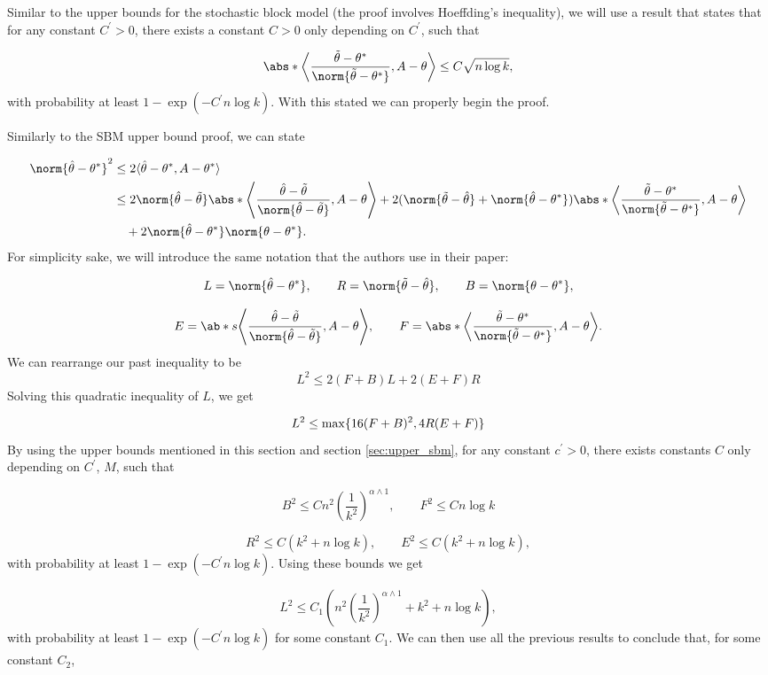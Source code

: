 \documentclass[11pt]{article}
\begin{document}
Similar to the upper bounds for the stochastic block model (the proof involves Hoeffding's inequality), we will use a result that states that for any constant $C^\prime > 0$, there exists a constant $C>0$ only depending on $C^\prime$, such that

\[  \abs*{\dprod*{\frac{\ttheta - \atheta}{\norm{\ttheta-\atheta}}, A-\theta}} \leq C\sqrt{n\log k},
\]
with probability at least $1-\exp(-C^\prime n \log k)$. With this stated we can properly begin the proof.

Similarly to the SBM upper bound proof, we can state

\begin{align*}
    \norm{\htheta - \atheta}^2 & \leq 2\dprod{\htheta - \atheta, A - \atheta} \\
    & \leq 2\norm{\htheta - \ttheta}\abs*{\dprod*{\frac{\htheta-\ttheta}{\norm{\htheta-\ttheta}},A-\theta}} + 2(\norm{\ttheta-\htheta} + \norm{\htheta-\atheta})\abs*{\dprod*{\frac{\ttheta-\atheta}{\norm{\ttheta-\atheta}},A-\theta}} \\
    & \quad + 2\norm{\htheta-\atheta}\norm{\theta-\atheta}.
\end{align*}
For simplicity sake, we will introduce the same notation that the authors use in their paper:

\[ L = \norm{\htheta-\atheta}, \qquad R = \norm{\ttheta-\htheta}, \qquad B = \norm{\theta - \atheta},  \]

\[ E = \ab*s{\dprod*{\frac{\htheta-\ttheta}{\norm{\htheta-\ttheta}},A-\theta}}, \qquad F = \abs*{\dprod*{\frac{\ttheta-\atheta}{\norm{\ttheta-\atheta}},A-\theta}}.  \]
We can rearrange our past inequality to be
\[
L^2 \leq 2(F+B)L + 2(E+F)R
\]
Solving this quadratic inequality of $L$, we get

\[
L^2 \leq \max\{16(F+B)^2, 4R(E+F)\}
\]
By using the upper bounds mentioned in this section and section \ref{sec:upper_sbm}, for any constant $c^\prime >0$, there exists constants $C$ only depending on $C^\prime$, $M$, such that

\[ B^2 \leq Cn^2 \left(\frac{1}{k^2}\right)^{\alpha \wedge 1}, \qquad F^2 \leq Cn\log k   \]

\[ R^2 \leq C(k^2 + n\log k), \qquad E^2 \leq C(k^2 + n\log k),   \]
with probability at least $1-\exp(-C^\prime n \log k)$. Using these bounds we get

\[ L^2 \leq C_1 \left( n^2 \left( \frac{1}{k^2} \right)^{\alpha \wedge 1} + k^2 + n\log k  \right),
\]
with probability at least $1-\exp(-C^\prime n \log k)$ for some constant $C_1$. We can then use all the previous results to conclude that, for some constant $C_2$,
\end{document}
